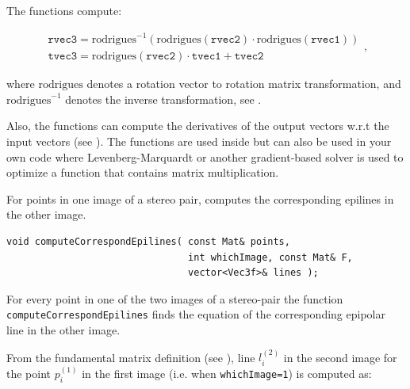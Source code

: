 \begin{description}
The functions compute:

\[ \begin{array}{l}
\texttt{rvec3} = \mathrm{rodrigues}^{-1}\left(\mathrm{rodrigues}(\texttt{rvec2}) \cdot
\mathrm{rodrigues}(\texttt{rvec1})\right) \\
\texttt{tvec3} = \mathrm{rodrigues}(\texttt{rvec2}) \cdot \texttt{tvec1} + \texttt{tvec2}
\end{array}, \]

where $\mathrm{rodrigues}$ denotes a rotation vector to rotation matrix transformation, and $\mathrm{rodrigues}^{-1}$ denotes the inverse transformation, see .

Also, the functions can compute the derivatives of the output vectors w.r.t the input vectors (see ).
The functions are used inside  but can also be used in your own code where Levenberg-Marquardt or another gradient-based solver is used to optimize a function that contains matrix multiplication.


\label{computeCorrespondEpilines}
For points in one image of a stereo pair, computes the corresponding epilines in the other image.

\begin{lstlisting}
void computeCorrespondEpilines( const Mat& points,
                                int whichImage, const Mat& F,
                                vector<Vec3f>& lines );
\end{lstlisting}
\begin{description}
\end{description}

For every point in one of the two images of a stereo-pair the function
\texttt{computeCorrespondEpilines} finds the equation of the
corresponding epipolar line in the other image.

From the fundamental matrix definition (see ),
line $l^{(2)}_i$ in the second image for the point $p^{(1)}_i$ in the first image (i.e. when \texttt{whichImage=1}) is computed as:


\end{description}
